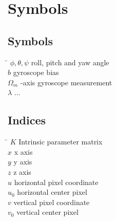 \chapter*{Symbols}
\label{chapter:symbols}

\section*{Symbols}

\begin{tabbing}
 \hspace*{1.6cm} \= \kill
  $\phi, \theta, \psi$ \> roll, pitch and yaw angle \\[0.5ex] 					
  $b$ \> gyroscope bias \\[0.5ex]										
  $\Omega_m$ -axis gyroscope measurement \\[0.5ex]
  $\lambda$ \> ... \\[0.5ex]
\end{tabbing}

\section*{Indices}
\begin{tabbing}
 \hspace*{1.6cm}  \= \kill
 $K$ \> Intrinsic parameter matrix \\[0.5ex]
 $x$ \> x axis \\[0.5ex]
 $y$ \> y axis \\[0.5ex]
 $z$ \> z axis \\[0.5ex]
 $u$ \> horizontal pixel coordinate \\[0.5ex]
 $u_0$ \> horizontal center pixel \\[0.5ex]
 $v$ \> vertical pixel coordinate \\[0.5ex]
 $v_0$ \> vertical center pixel \\[0.5ex]
\end{tabbing}

